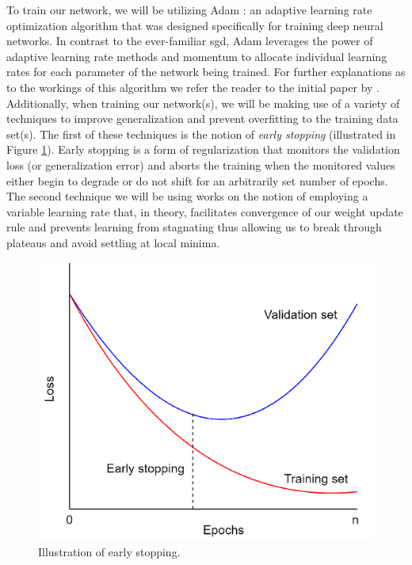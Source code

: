 \noindent \newline To train our network, we will be utilizing Adam \cite{Kingma}: an adaptive learning rate optimization algorithm that was designed specifically for training deep neural networks. In contrast to the ever-familiar \gls{sgd}, Adam leverages the power of adaptive learning rate methods and momentum to allocate individual learning rates for each parameter of the network being trained. For further explanations as to the workings of this algorithm we refer the reader to the initial paper by \citet{Kingma}. Additionally, when training our network(s), we will be making use of a variety of techniques to improve generalization and prevent overfitting to the training data set(s). The first of these techniques is the notion of \textit{early stopping} (illustrated in Figure \ref{fig:Early-Stopping}). Early stopping is a form of regularization that monitors the validation loss (or generalization error) and aborts the training when the monitored values either begin to degrade or do not shift for an arbitrarily set number of epochs. The second technique we will be using works on the notion of employing a variable learning rate that, in theory, facilitates convergence of our weight update rule and prevents learning from stagnating thus allowing us to break through plateaus and avoid settling at local minima.


\begin{figure}[H]
    \centering
    \includegraphics[width=\textwidth]{Images/Chapter 5/Stage 4/Other/Early-Stopping.pdf}
    \caption{Illustration of early stopping.}
    \label{fig:Early-Stopping}
\end{figure}

